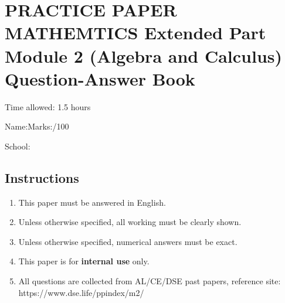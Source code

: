 \documentclass[12pt]{article}
\begin{document}
    \thispagestyle{plain}

    \centering 

    \section*{PRACTICE PAPER\\MATHEMTICS Extended Part\\Module 2 (Algebra and Calculus)\\Question-Answer Book}

    Time allowed: 1.5 hours

    Name:\hrulefill \hfill Marks:\hrulefill/100

    School:\hrulefill

    \raggedright

    \subsection*{Instructions}

    \begin{enumerate}
        \item This paper must be answered in English.
        \item Unless otherwise specified, all working must be clearly shown.
        \item Unless otherwise specified, numerical answers must be exact.
        \item This paper is for \textbf{internal use} only.
        \item All questions are collected from AL/CE/DSE past papers, reference site: https://www.dse.life/ppindex/m2/
    \end{enumerate}
\end{document}
